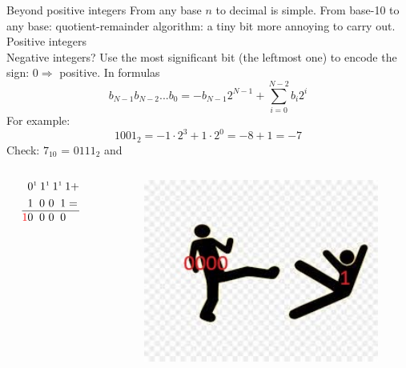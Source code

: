 \documentclass[10pt]{beamer}
\newcommand{\green}[1]{\textcolor{myGreen}{#1}}
\newcommand{\red}[1]{\textcolor{red}{#1}}
\newcommand{\ok}{\green{\ding{51}}}
\renewcommand{\[}{\begin{equation*}}
\renewcommand{\]}{\end{equation*}}
\begin{document}
\begin{frame}{Beyond positive integers}
From any base $n$ to decimal is simple. From base-10 to any base: quotient-remainder algorithm: a tiny bit more annoying to carry out.\\
Positive integers \ok\\
Negative integers? Use the most significant bit (the leftmost one) to encode the sign: $0\Rightarrow$ positive. In formulas
\[
b_{N-1}b_{N-2}...b_{0} = -b_{N-1}2^{N-1} + \sum_{i=0}^{N-2}b_{i}2^{i}
\]
\pause
For example:
\[
1001_{2} = -1\cdot 2^3 + 1\cdot 2^0 = -8+1 = -7
\]
Check: $7_{10}$ = $0111_{2}$ and
\begin{columns}
\begin{column}{0.75\textwidth}
\[
\begin{split}
&0^\text{\tiny 1 }1^\text{\tiny 1 }1^\text{\tiny 1 }1 +\\
&1\ \: 0\  0\ \:  1 = \\
\hline 
\red{1}&0\ \: 0\ 0\ \: 0
\end{split}
\] 
\end{column}
\begin{column}{0.25\textwidth}
\begin{figure}
    \includegraphics[width=1\textwidth,left]{Notes/Figures/download.jpeg}
    \hfill
\end{figure}

\end{column}
\end{columns}
\end{frame}
\end{document}
